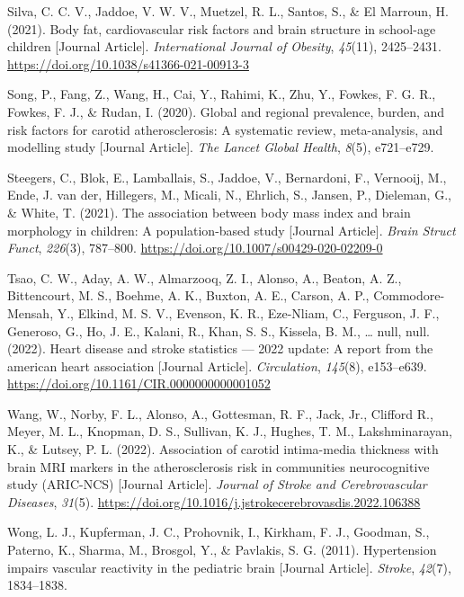 \documentclass[
  letterpaper,
  DIV=11,
  numbers=noendperiod]{scrreport}
\newlength{\cslhangindent}
\newenvironment{CSLReferences}[2] %
 {\begin{list}{}{%
  \setlength{\itemindent}{0pt}
  \setlength{\leftmargin}{0pt}
  \setlength{\parsep}{0pt}
  \ifodd #1
   \setlength{\leftmargin}{\cslhangindent}
   \setlength{\itemindent}{-1\cslhangindent}
  \fi
  \setlength{\itemsep}{#2\baselineskip}}}
 {\end{list}}
\begin{document}
\begin{CSLReferences}{1}{0}
Silva, C. C. V., Jaddoe, V. W. V., Muetzel, R. L., Santos, S., \& El
Marroun, H. (2021). Body fat, cardiovascular risk factors and brain
structure in school-age children {[}Journal Article{]}.
\emph{International Journal of Obesity}, \emph{45}(11), 2425--2431.
\url{https://doi.org/10.1038/s41366-021-00913-3}

Song, P., Fang, Z., Wang, H., Cai, Y., Rahimi, K., Zhu, Y., Fowkes, F.
G. R., Fowkes, F. J., \& Rudan, I. (2020). Global and regional
prevalence, burden, and risk factors for carotid atherosclerosis: A
systematic review, meta-analysis, and modelling study {[}Journal
Article{]}. \emph{The Lancet Global Health}, \emph{8}(5), e721--e729.

Steegers, C., Blok, E., Lamballais, S., Jaddoe, V., Bernardoni, F.,
Vernooij, M., Ende, J. van der, Hillegers, M., Micali, N., Ehrlich, S.,
Jansen, P., Dieleman, G., \& White, T. (2021). The association between
body mass index and brain morphology in children: A population-based
study {[}Journal Article{]}. \emph{Brain Struct Funct}, \emph{226}(3),
787--800. \url{https://doi.org/10.1007/s00429-020-02209-0}

Tsao, C. W., Aday, A. W., Almarzooq, Z. I., Alonso, A., Beaton, A. Z.,
Bittencourt, M. S., Boehme, A. K., Buxton, A. E., Carson, A. P.,
Commodore-Mensah, Y., Elkind, M. S. V., Evenson, K. R., Eze-Nliam, C.,
Ferguson, J. F., Generoso, G., Ho, J. E., Kalani, R., Khan, S. S.,
Kissela, B. M., \ldots{} null, null. (2022). Heart disease and stroke
statistics --- 2022 update: A report from the american heart association
{[}Journal Article{]}. \emph{Circulation}, \emph{145}(8), e153--e639.
\url{https://doi.org/10.1161/CIR.0000000000001052}

Wang, W., Norby, F. L., Alonso, A., Gottesman, R. F., Jack, Jr.,
Clifford R., Meyer, M. L., Knopman, D. S., Sullivan, K. J., Hughes, T.
M., Lakshminarayan, K., \& Lutsey, P. L. (2022). Association of carotid
intima-media thickness with brain MRI markers in the atherosclerosis
risk in communities neurocognitive study (ARIC-NCS) {[}Journal
Article{]}. \emph{Journal of Stroke and Cerebrovascular Diseases},
\emph{31}(5).
\url{https://doi.org/10.1016/j.jstrokecerebrovasdis.2022.106388}

Wong, L. J., Kupferman, J. C., Prohovnik, I., Kirkham, F. J., Goodman,
S., Paterno, K., Sharma, M., Brosgol, Y., \& Pavlakis, S. G. (2011).
Hypertension impairs vascular reactivity in the pediatric brain
{[}Journal Article{]}. \emph{Stroke}, \emph{42}(7), 1834--1838.


\end{CSLReferences}
\end{document}
